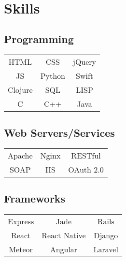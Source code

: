 \documentclass[letterpaper]{deedy-resume} %
\begin{document}
\begin{minipage}[t]{0.33\textwidth}
  \sectionspace %


  \section{Skills}

  \vspace{2mm}

  \subsection{Programming}

  \begin{tabular}{ c c c }
    HTML    & CSS    & jQuery \\
    JS      & Python & Swift    \\
    Clojure & SQL    & LISP   \\
    C       & C++    & Java \\
  \end{tabular}

  \vspace{4mm}

  \subsection{Web Servers/Services}

  \begin{tabular}{ c c c }
    Apache & Nginx & RESTful \\
    SOAP & IIS & OAuth 2.0
  \end{tabular}

  \vspace{4mm}

  \subsection{Frameworks}

  \begin{tabular}{ c c c }
    Express & Jade & Rails \\
    React & React Native & Django \\
    Meteor & Angular & Laravel
  \end{tabular}

  \vspace{4mm}


\end{minipage}
\end{document}
